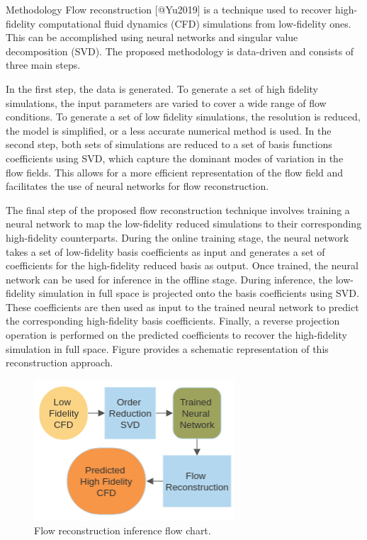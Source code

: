 \begin{frame}{Methodology}
\protect\hypertarget{methodology}{}
Flow reconstruction {[}@Yu2019{]} is a technique used to recover
high-fidelity computational fluid dynamics (CFD) simulations from
low-fidelity ones. This can be accomplished using neural networks and
singular value decomposition (SVD). The proposed methodology is
data-driven and consists of three main steps.

In the first step, the data is generated. To generate a set of high
fidelity simulations, the input parameters are varied to cover a wide
range of flow conditions. To generate a set of low fidelity simulations,
the resolution is reduced, the model is simplified, or a less accurate
numerical method is used. In the second step, both sets of simulations
are reduced to a set of basis functions coefficients using SVD, which
capture the dominant modes of variation in the flow fields. This allows
for a more efficient representation of the flow field and facilitates
the use of neural networks for flow reconstruction.

The final step of the proposed flow reconstruction technique involves
training a neural network to map the low-fidelity reduced simulations to
their corresponding high-fidelity counterparts. During the online
training stage, the neural network takes a set of low-fidelity basis
coefficients as input and generates a set of coefficients for the
high-fidelity reduced basis as output. Once trained, the neural network
can be used for inference in the offline stage. During inference, the
low-fidelity simulation in full space is projected onto the basis
coefficients using SVD. These coefficients are then used as input to the
trained neural network to predict the corresponding high-fidelity basis
coefficients. Finally, a reverse projection operation is performed on
the predicted coefficients to recover the high-fidelity simulation in
full space. Figure provides a schematic representation of this
reconstruction approach.

\begin{figure}
\hypertarget{fig:flow_chart}{%
\centering
\includegraphics{figures/inference.png}
\caption{Flow reconstruction inference flow
chart.}\label{fig:flow_chart}
}
\end{figure}


\end{frame}
